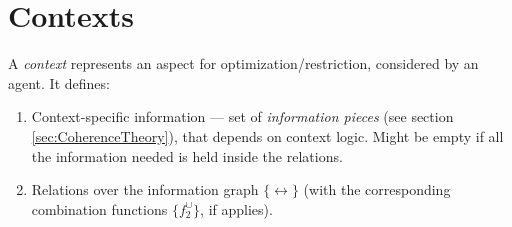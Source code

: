 \documentclass[../ThesisDoc]{subfiles}
\begin{document}
\providecommand{\rootdir}{..}


\section{Contexts}
\label{sec:solution-contexts}


A \emph{context} represents an aspect for optimization/restriction, considered
by an agent. It defines:
\begin{enumerate}
  \item Context-specific information --- set of \emph{information pieces}
        (see section \ref{sec:CoherenceTheory}), that depends on context logic.
        Might be empty if all the information needed is held inside the relations.
  \item Relations over the information graph $\{\rel\}$
        (with the corresponding combination functions $\{f^\cup_2\}$, if applies).


\end{enumerate}
\end{document}
